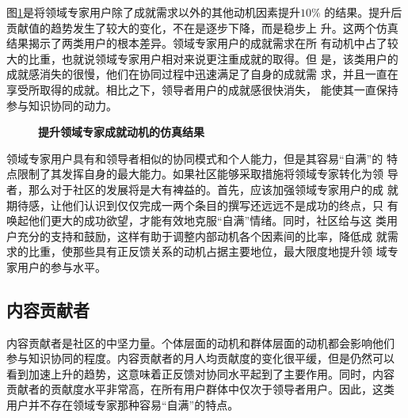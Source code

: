 图\ref{fig:improve3}是将领域专家用户除了成就需求以外的其他动机因素提升$10\%$
的结果。提升后贡献值的趋势发生了较大的变化，不在是逐步下降，而是稳步上
升。这两个仿真结果揭示了两类用户的根本差异。领域专家用户的成就需求在所
有动机中占了较大的比重，也就说领域专家用户相对来说更注重成就的取得。但
是，该类用户的成就感消失的很慢，他们在协同过程中迅速满足了自身的成就需
求，并且一直在享受所取得的成就。相比之下，领导者用户的成就感很快消失，
能使其一直保持参与知识协同的动力。

\begin{figure}[!htb]
  \centering
  \caption{\small{\textbf{提升领域专家成就动机的仿真结果}}}
  \label{fig:improve3}
\end{figure}

领域专家用户具有和领导者相似的协同模式和个人能力，但是其容易“自满”的
特点限制了其发挥自身的最大能力。如果社区能够采取措施将领域专家转化为领
导者，那么对于社区的发展将是大有裨益的。首先，应该加强领域专家用户的成
就期待感，让他们认识到仅仅完成一两个条目的撰写还远远不是成功的终点，只
有唤起他们更大的成功欲望，才能有效地克服“自满”情绪。同时，社区给与这
类用户充分的支持和鼓励，这样有助于调整内部动机各个因素间的比率，降低成
就需求的比重，使那些具有正反馈关系的动机占据主要地位，最大限度地提升领
域专家用户的参与水平。

\subsection{内容贡献者}

内容贡献者是社区的中坚力量。个体层面的动机和群体层面的动机都会影响他们
参与知识协同的程度。内容贡献者的月人均贡献度的变化很平缓，但是仍然可以
看到加速上升的趋势，这意味着正反馈对协同水平起到了主要作用。同时，内容
贡献者的贡献度水平非常高，在所有用户群体中仅次于领导者用户。因此，这类
用户并不存在领域专家那种容易“自满”的特点。

